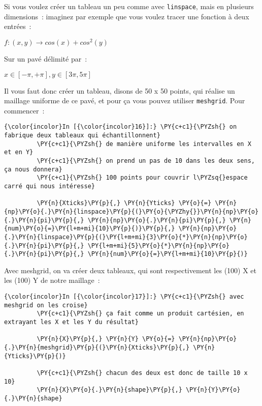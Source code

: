     Si vous voulez créer un tableau un peu comme avec \texttt{linspace},
mais en plusieurs dimensions~: imaginez par exemple que vous voulez
tracer une fonction à deux entrées~:

\(f : (x, y) \longrightarrow cos(x) + cos^2(y)\)

Sur un pavé délimité par~:

\(x \in [-\pi, +\pi], y \in [3\pi, 5\pi]\)

    Il vous faut donc créer un tableau, disons de 50 x 50 points, qui
réalise un maillage uniforme de ce pavé, et pour ça vous pouvez utiliser
\texttt{meshgrid}. Pour commencer~:

    \begin{Verbatim}[commandchars=\\\{\}]
{\color{incolor}In [{\color{incolor}16}]:} \PY{c+c1}{\PYZsh{} on fabrique deux tableaux qui échantillonnent}
         \PY{c+c1}{\PYZsh{} de manière uniforme les intervalles en X et en Y}
         \PY{c+c1}{\PYZsh{} on prend un pas de 10 dans les deux sens, ça nous donnera}
         \PY{c+c1}{\PYZsh{} 100 points pour couvrir l\PYZsq{}espace carré qui nous intéresse}
         
         \PY{n}{Xticks}\PY{p}{,} \PY{n}{Yticks} \PY{o}{=} \PY{n}{np}\PY{o}{.}\PY{n}{linspace}\PY{p}{(}\PY{o}{\PYZhy{}}\PY{n}{np}\PY{o}{.}\PY{n}{pi}\PY{p}{,} \PY{n}{np}\PY{o}{.}\PY{n}{pi}\PY{p}{,} \PY{n}{num}\PY{o}{=}\PY{l+m+mi}{10}\PY{p}{)}\PY{p}{,} \PY{n}{np}\PY{o}{.}\PY{n}{linspace}\PY{p}{(}\PY{l+m+mi}{3}\PY{o}{*}\PY{n}{np}\PY{o}{.}\PY{n}{pi}\PY{p}{,} \PY{l+m+mi}{5}\PY{o}{*}\PY{n}{np}\PY{o}{.}\PY{n}{pi}\PY{p}{,} \PY{n}{num}\PY{o}{=}\PY{l+m+mi}{10}\PY{p}{)}
\end{Verbatim}


    Avec meshgrid, on va créer deux tableaux, qui sont respectivement les
(100) X et les (100) Y de notre maillage~:

    \begin{Verbatim}[commandchars=\\\{\}]
{\color{incolor}In [{\color{incolor}17}]:} \PY{c+c1}{\PYZsh{} avec meshgrid on les croise}
         \PY{c+c1}{\PYZsh{} ça fait comme un produit cartésien, en extrayant les X et les Y du résultat}
         
         \PY{n}{X}\PY{p}{,} \PY{n}{Y} \PY{o}{=} \PY{n}{np}\PY{o}{.}\PY{n}{meshgrid}\PY{p}{(}\PY{n}{Xticks}\PY{p}{,} \PY{n}{Yticks}\PY{p}{)}
         
         \PY{c+c1}{\PYZsh{} chacun des deux est donc de taille 10 x 10}
         \PY{n}{X}\PY{o}{.}\PY{n}{shape}\PY{p}{,} \PY{n}{Y}\PY{o}{.}\PY{n}{shape}
\end{Verbatim}


